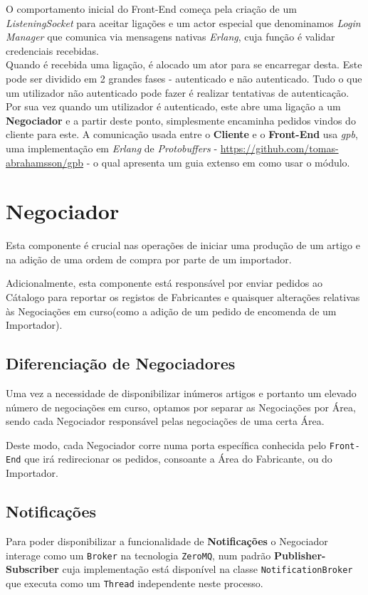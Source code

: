\documentclass[12pt, a4paper]{report}
\begin{document}
O comportamento inicial do Front-End começa pela criação de um
\textit{ListeningSocket} para aceitar ligações e um actor especial que 
denominamos \textit{Login Manager} que comunica via mensagens nativas
\textit{Erlang}, cuja função é validar credenciais recebidas. \\
Quando é recebida uma ligação, é alocado um ator para se encarregar desta.
Este pode ser dividido em 2 grandes fases - autenticado e não autenticado.
Tudo o que um utilizador não autenticado pode fazer é realizar tentativas de
autenticação. Por sua vez quando um utilizador é autenticado, este abre uma
ligação a um \textbf{Negociador} e a partir deste ponto, simplesmente encaminha
pedidos vindos do cliente para este. A comunicação usada entre
o \textbf{Cliente} e o \textbf{Front-End} usa \textit{gpb}, uma implementação em
\textit{Erlang} de \textit{Protobuffers}
- \url{https://github.com/tomas-abrahamsson/gpb} - o qual apresenta um guia
extenso em como usar o módulo.

 
\chapter{Negociador}
Esta componente é crucial nas operações de iniciar uma produção de um artigo e na adição de uma ordem de compra por parte de um importador.


Adicionalmente, esta componente está responsável por enviar pedidos ao Cátalogo para reportar os registos de Fabricantes e quaisquer alterações relativas às Negociações em curso(como a adição de um pedido de encomenda de um Importador).

\section{Diferenciação de Negociadores}
Uma vez a necessidade de disponibilizar inúmeros artigos e portanto um elevado número de negociações em curso, optamos por separar as Negociações por Área, sendo cada Negociador responsável pelas negociações de uma certa Área.


Deste modo, cada Negociador corre numa porta específica conhecida pelo \texttt{Front-End} que irá redirecionar os pedidos, consoante a Área do Fabricante, ou do Importador.

\section{Notificações}
Para poder disponibilizar a funcionalidade de \textbf{Notificações} o Negociador interage como um \texttt{Broker} na tecnologia \texttt{ZeroMQ}, num padrão \textbf{Publisher-Subscriber} cuja implementação está disponível na classe \texttt{NotificationBroker} que executa como um \texttt{Thread} independente neste processo.
\end{document}
